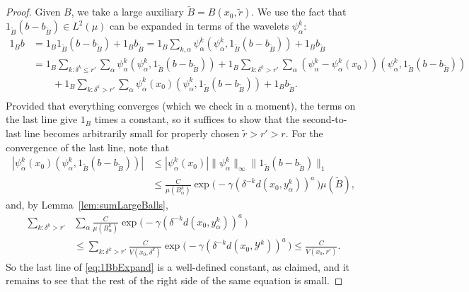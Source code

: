\documentclass{amsart}
\numberwithin{equation}{section}
\theoremstyle{plain}
\theoremstyle{definition}
\theoremstyle{remark}
\begin{document}
{{{\begin{proof}
Given $B$, we take a large auxiliary $\tilde{B}=B(x_0,\tilde{r})$. We use the fact that $1_{\tilde{B}}(b-b_{\tilde{B}})\in L^2(\mu)$ can be expanded in terms of the wavelets $\psi^k_\alpha$:
\begin{equation}\label{eq:1BbExpand}
\begin{split}
  1_B b
  &=1_B 1_{\tilde{B}}(b-b_{\tilde{B}})+1_B b_{\tilde{B}}
  =1_B \sum_{k,\alpha}\psi^k_\alpha(\psi^k_\alpha,1_{\tilde{B}}(b-b_{\tilde{B}}))+1_B b_{\tilde{B}} \\
  &=1_B \sum_{k:\delta^k\leq r'}\sum_{\alpha}\psi^k_\alpha(\psi^k_\alpha,1_{\tilde{B}}(b-b_{\tilde{B}}))
     +1_B \sum_{k:\delta^k> r'}\sum_{\alpha}(\psi^k_\alpha-\psi^k_\alpha(x_0))(\psi^k_\alpha,1_{\tilde{B}}(b-b_{\tilde{B}})) \\
   &\qquad  +1_B \sum_{k:\delta^k> r'}\sum_{\alpha}\psi^k_\alpha(x_0)(\psi^k_\alpha,1_{\tilde{B}}(b-b_{\tilde{B}}))
     +1_B b_{\tilde{B}}. \\
\end{split}
\end{equation}
Provided that everything converges (which we check in a moment), the terms on the last line give $1_B$ times a constant, so it suffices to show that the second-to-last line becomes arbitrarily small for properly chosen $\tilde{r}>r'>r$. For the convergence of the last line, note that
\begin{equation*}
\begin{split}
  {|{\psi^k_\alpha(x_0)(\psi^k_\alpha,1_{\tilde{B}}(b-b_{\tilde{B}}))}|}
  &\leq{|{\psi^k_\alpha(x_0)}|}{\|{\psi^k_\alpha}\|_{{\infty}}}{\|{1_{\tilde{B}}(b-b_{\tilde{B}})}\|_{{1}}} \\
  &\leq\frac{C}{\mu(B^k_\alpha)}\exp\big(-\gamma(\delta ^{-k}{d(x_0,y^k_{\alpha})})^a\, \big)
\mu(\tilde{B}),
\end{split}
\end{equation*}
and, by Lemma~\ref{lem:sumLargeBalls},
\begin{equation*}
\begin{split}
  \sum_{k:\delta^k> r'} &\sum_{\alpha}\frac{C}{\mu(B^k_\alpha)}\exp\big(-\gamma(\delta ^{-k}{d(x_0,y^k_{\alpha})})^a\, \big) \\
  &\leq\sum_{k:\delta^k>r'}\frac{C}{V(x_0,\delta^k)}\exp\big(-\gamma(\delta ^{-k}{d(x_0,\mathscr{Y}^k)})^a\, \big)
  \leq\frac{C}{V(x_0,r')}.
\end{split}
\end{equation*}
So the last line of \eqref{eq:1BbExpand} is a well-defined constant, as claimed, and it remains to see that the rest of the right side of the same equation is small.


\end{proof}}}}
\end{document}
